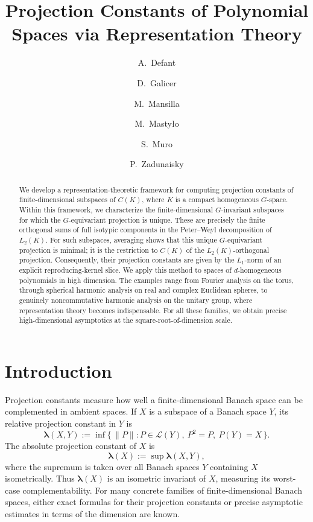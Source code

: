 \documentclass[11pt,showkeys]{amsart}
\title[Projection Constants of Polynomial Spaces via Representation Theory]{Projection Constants of Polynomial Spaces via Representation Theory}
\author{}
\date{}
\author[Defant]{A.~Defant}
\author[Galicer]{D.~Galicer}
\author[Mansilla]{M.~Mansilla}
\author[Masty{\l}o]{M.~Masty{\l}o}
\author[Muro]{S.~Muro}
\author[Zadunaisky]{P.~Zadunaisky}
\date{}
\begin{document}
\begin{abstract}
We develop a representation-theoretic framework for computing projection
constants of finite-dimensional subspaces of \(C(K)\), where \(K\) is a
compact homogeneous \(G\)-space. Within this framework, we characterize
the finite-dimensional \(G\)-invariant subspaces for which the
\(G\)-equivariant projection is unique. These are precisely the finite
orthogonal sums of full isotypic components in the Peter--Weyl
decomposition of \(L_2(K)\). For such subspaces, averaging shows that
this unique \(G\)-equivariant projection is minimal; it is the restriction
to \(C(K)\) of the \(L_2(K)\)-orthogonal projection. Consequently, their
projection constants are given by the \(L_1\)-norm of an explicit
reproducing-kernel slice.
We apply this method to spaces of \(d\)-homogeneous polynomials in high
dimension. The examples range from Fourier analysis on the torus,
through spherical harmonic analysis on real and complex Euclidean
spheres, to genuinely noncommutative harmonic analysis on the unitary
group, where representation theory becomes indispensable. For all
these families, we obtain precise high-dimensional asymptotics at the
square-root-of-dimension scale.
\end{abstract}


\maketitle

\tableofcontents

\newpage







\section*{Introduction}

Projection constants measure how well a finite-dimensional Banach space
can be complemented in ambient spaces. If \(X\) is a subspace of a Banach
space \(Y\), its relative projection constant in \(Y\) is
\[
        \boldsymbol\lambda(X,Y)
        :=
        \inf\{ \,\|P\|:P\in\mathcal L(Y),\ P^2=P,\ P(Y)=X \, \}.
\]
The absolute projection constant of \(X\) is
\[
        \boldsymbol\lambda(X)
        :=
        \sup \boldsymbol\lambda(X,Y),
\]
where the supremum is taken over all Banach spaces \(Y\) containing \(X\)
isometrically. Thus \(\boldsymbol\lambda(X)\) is an isometric invariant of \(X\), measuring its
worst-case complementability.
For many concrete families of finite-dimensional Banach spaces, either exact
formulas for their projection constants or precise asymptotic estimates in
terms of the dimension are known.
\end{document}
